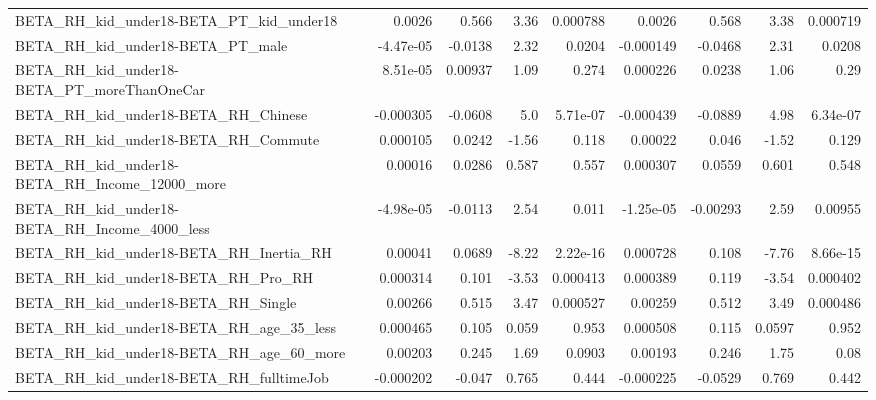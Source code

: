 \begin{tabular}{lrrrrrrrr}
BETA\_RH\_kid\_under18-BETA\_PT\_kid\_under18            &      0.0026 &        0.566 &     3.36 & 0.000788 &     0.0026 &       0.568 &         3.38 &      0.000719 \\
BETA\_RH\_kid\_under18-BETA\_PT\_male                   &   -4.47e-05 &      -0.0138 &     2.32 &   0.0204 &  -0.000149 &     -0.0468 &         2.31 &        0.0208 \\
BETA\_RH\_kid\_under18-BETA\_PT\_moreThanOneCar         &    8.51e-05 &      0.00937 &     1.09 &    0.274 &   0.000226 &      0.0238 &         1.06 &          0.29 \\
BETA\_RH\_kid\_under18-BETA\_RH\_Chinese                &   -0.000305 &      -0.0608 &      5.0 & 5.71e-07 &  -0.000439 &     -0.0889 &         4.98 &      6.34e-07 \\
BETA\_RH\_kid\_under18-BETA\_RH\_Commute                &    0.000105 &       0.0242 &    -1.56 &    0.118 &    0.00022 &       0.046 &        -1.52 &         0.129 \\
BETA\_RH\_kid\_under18-BETA\_RH\_Income\_12000\_more      &     0.00016 &       0.0286 &    0.587 &    0.557 &   0.000307 &      0.0559 &        0.601 &         0.548 \\
BETA\_RH\_kid\_under18-BETA\_RH\_Income\_4000\_less       &   -4.98e-05 &      -0.0113 &     2.54 &    0.011 &  -1.25e-05 &    -0.00293 &         2.59 &       0.00955 \\
BETA\_RH\_kid\_under18-BETA\_RH\_Inertia\_RH             &     0.00041 &       0.0689 &    -8.22 & 2.22e-16 &   0.000728 &       0.108 &        -7.76 &      8.66e-15 \\
BETA\_RH\_kid\_under18-BETA\_RH\_Pro\_RH                 &    0.000314 &        0.101 &    -3.53 & 0.000413 &   0.000389 &       0.119 &        -3.54 &      0.000402 \\
BETA\_RH\_kid\_under18-BETA\_RH\_Single                 &     0.00266 &        0.515 &     3.47 & 0.000527 &    0.00259 &       0.512 &         3.49 &      0.000486 \\
BETA\_RH\_kid\_under18-BETA\_RH\_age\_35\_less            &    0.000465 &        0.105 &    0.059 &    0.953 &   0.000508 &       0.115 &       0.0597 &         0.952 \\
BETA\_RH\_kid\_under18-BETA\_RH\_age\_60\_more            &     0.00203 &        0.245 &     1.69 &   0.0903 &    0.00193 &       0.246 &         1.75 &          0.08 \\
BETA\_RH\_kid\_under18-BETA\_RH\_fulltimeJob            &   -0.000202 &       -0.047 &    0.765 &    0.444 &  -0.000225 &     -0.0529 &        0.769 &         0.442 \\

\end{tabular}
